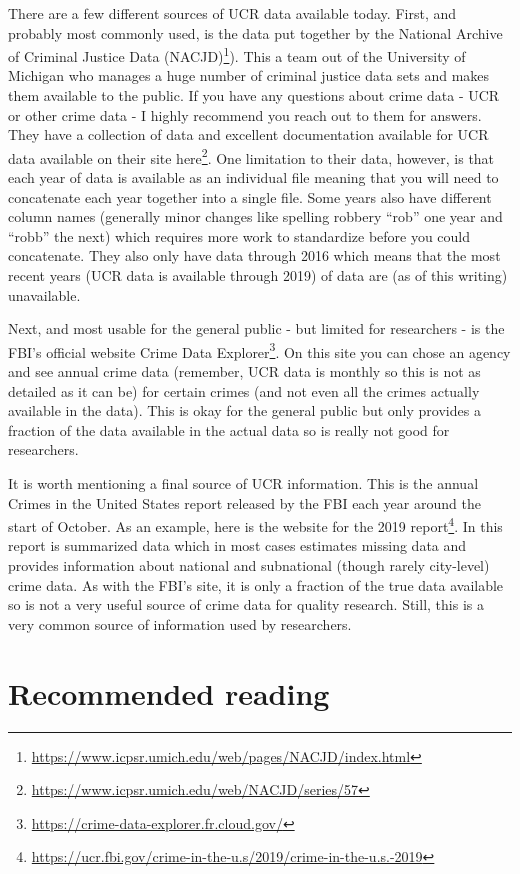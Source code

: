 \documentclass[
]{krantz}
\renewcommand{\href}[2]{#2\footnote{\url{#1}}}
\begin{document}
There are a few different sources of UCR data available
today. First, and probably most commonly used, is the data
put together by the
\href{https://www.icpsr.umich.edu/web/pages/NACJD/index.html}{National
Archive of Criminal Justice Data (NACJD)}). This a team out
of the University of Michigan who manages a huge number of
criminal justice data sets and makes them available to the
public. If you have any questions about crime data - UCR or
other crime data - I highly recommend you reach out to them
for answers. They have a collection of data and excellent
documentation available for UCR data available on their site
\href{https://www.icpsr.umich.edu/web/NACJD/series/57}{here}.
One limitation to their data, however, is that each year of
data is available as an individual file meaning that you
will need to concatenate each year together into a single
file. Some years also have different column names (generally
minor changes like spelling robbery ``rob'' one year and
``robb'' the next) which requires more work to standardize
before you could concatenate. They also only have data
through 2016 which means that the most recent years (UCR
data is available through 2019) of data are (as of this
writing) unavailable.

Next, and most usable for the general public - but limited
for researchers - is the FBI's official website
\href{https://crime-data-explorer.fr.cloud.gov/}{Crime Data
Explorer}. On this site you can chose an agency and see
annual crime data (remember, UCR data is monthly so this is
not as detailed as it can be) for certain crimes (and not
even all the crimes actually available in the data). This is
okay for the general public but only provides a fraction of
the data available in the actual data so is really not good
for researchers.

It is worth mentioning a final source of UCR information.
This is the annual Crimes in the United States report
released by the FBI each year around the start of October.
As an example, here is the
\href{https://ucr.fbi.gov/crime-in-the-u.s/2019/crime-in-the-u.s.-2019}{website
for the 2019 report}. In this report is summarized data
which in most cases estimates missing data and provides
information about national and subnational (though rarely
city-level) crime data. As with the FBI's site, it is only a
fraction of the true data available so is not a very useful
source of crime data for quality research. Still, this is a
very common source of information used by researchers.

\section{Recommended reading}\label{recommended-reading}
\end{document}

